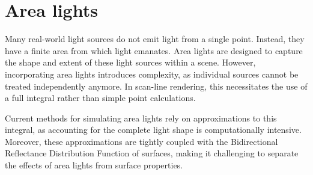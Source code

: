 \section{Area lights}

Many real-world light sources do not emit light from a single point. Instead, they have a finite area from which light emanates. 
Area lights are designed to capture the shape and extent of these light sources within a scene. 
However, incorporating area lights introduces complexity, as individual sources cannot be treated independently anymore. 
In scan-line rendering, this necessitates the use of a full integral rather than simple point calculations.

Current methods for simulating area lights rely on approximations to this integral, as accounting for the complete light shape is computationally intensive. 
Moreover, these approximations are tightly coupled with the Bidirectional Reflectance Distribution Function of surfaces, making it challenging to separate the effects of area lights from surface properties.